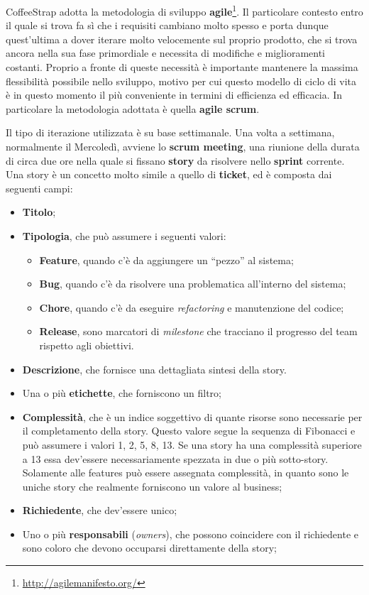 CoffeeStrap adotta la metodologia di sviluppo \textbf{\gls{agile}}\footnote{\url{http://agilemanifesto.org/}}. Il particolare contesto entro il quale si trova fa sì che i requisiti cambiano molto spesso e porta dunque quest'ultima a dover iterare molto velocemente sul proprio prodotto, che si trova ancora nella sua fase primordiale e necessita di modifiche e miglioramenti costanti. Proprio a fronte di queste necessità è importante mantenere la massima flessibilità possibile nello sviluppo, motivo per cui questo modello di ciclo di vita è in questo momento il più conveniente in termini di efficienza ed efficacia. In particolare la metodologia adottata è quella \textbf{agile \gls{scrum}}.

Il tipo di iterazione utilizzata è su base settimanale. Una volta a settimana, normalmente il Mercoledì, avviene lo \textbf{scrum meeting}, una riunione della durata di circa due ore nella quale si fissano \textbf{story} da risolvere nello \textbf{\gls{sprint}} corrente. Una story è un concetto molto simile a quello di \textbf{ticket}, ed è composta dai seguenti campi:

\begin{itemize}

\item \textbf{Titolo};
\item \textbf{Tipologia}, che può assumere i seguenti valori:

	\begin{itemize}

	\item \textbf{Feature}, quando c'è da aggiungere un ``pezzo'' al sistema;
	\item \textbf{Bug}, quando c'è da risolvere una problematica all'interno del sistema;
	\item \textbf{Chore}, quando c'è da eseguire \textit{refactoring} e manutenzione del codice;
	\item \textbf{Release}, sono marcatori di \textit{milestone} che tracciano il progresso del team rispetto agli obiettivi.

	\end{itemize}

\item \textbf{Descrizione}, che fornisce una dettagliata sintesi della story.
\item Una o più \textbf{etichette}, che forniscono un filtro;
\item \textbf{Complessità}, che è un indice soggettivo di quante risorse sono necessarie per il completamento della story. Questo valore segue la sequenza di Fibonacci e può assumere i valori 1, 2, 5, 8, 13. Se una story ha una complessità superiore a 13 essa dev'essere necessariamente spezzata in due o più sotto-story. Solamente alle features può essere assegnata complessità, in quanto sono le uniche story che realmente forniscono un valore al business;
\item \textbf{Richiedente}, che dev'essere unico;
\item Uno o più \textbf{responsabili} (\textit{owners}), che possono coincidere con il richiedente e sono coloro che devono occuparsi direttamente della story;

\end{itemize}

